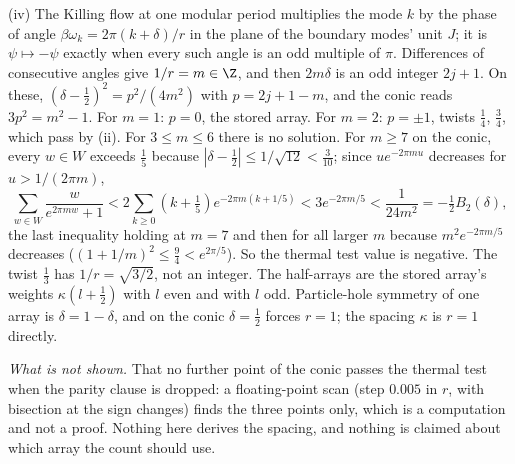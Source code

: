 (iv) The Killing flow at one modular period multiplies the mode $k$ by the phase of angle $\beta\omega_{k} = 2\pi(k + \delta)/r$ in the plane of the boundary modes' unit $J$; it is $\psi \mapsto -\psi$ exactly when every such angle is an odd multiple of $\pi$. Differences of consecutive angles give $1/r = m \in \Z$, and then $2m\delta$ is an odd integer $2j + 1$. On these, $(\delta - \tfrac12)^{2} = p^{2}/(4m^{2})$ with $p = 2j + 1 - m$, and the conic reads $3p^{2} = m^{2} - 1$. For $m = 1$: $p = 0$, the stored array. For $m = 2$: $p = \pm 1$, twists $\tfrac14$, $\tfrac34$, which pass by (ii). For $3 \le m \le 6$ there is no solution. For $m \ge 7$ on the conic, every $w \in W$ exceeds $\tfrac15$ because $|\delta - \tfrac12| \le 1/\sqrt{12} < \tfrac{3}{10}$; since $ue^{-2\pi mu}$ decreases for $u > 1/(2\pi m)$,
\[
\sum_{w \in W}\frac{w}{e^{2\pi mw} + 1} < 2\sum_{k \ge 0}(k + \tfrac15)e^{-2\pi m(k + 1/5)} < 3e^{-2\pi m/5} < \frac{1}{24m^{2}} = -\tfrac12 B_{2}(\delta),
\]
the last inequality holding at $m = 7$ and then for all larger $m$ because $m^{2}e^{-2\pi m/5}$ decreases ($(1 + 1/m)^{2} \le \tfrac94 < e^{2\pi/5}$). So the thermal test value is negative. The twist $\tfrac13$ has $1/r = \sqrt{3/2}$, not an integer. The half-arrays are the stored array's weights $\kappa(l + \tfrac12)$ with $l$ even and with $l$ odd. Particle-hole symmetry of one array is $\delta = 1 - \delta$, and on the conic $\delta = \tfrac12$ forces $r = 1$; the spacing $\kappa$ is $r = 1$ directly.

\emph{What is not shown.} That no further point of the conic passes the thermal test when the parity clause is dropped: a floating-point scan (step $0.005$ in $r$, with bisection at the sign changes) finds the three points only, which is a computation and not a proof. Nothing here derives the spacing, and nothing is claimed about which array the count should use.
